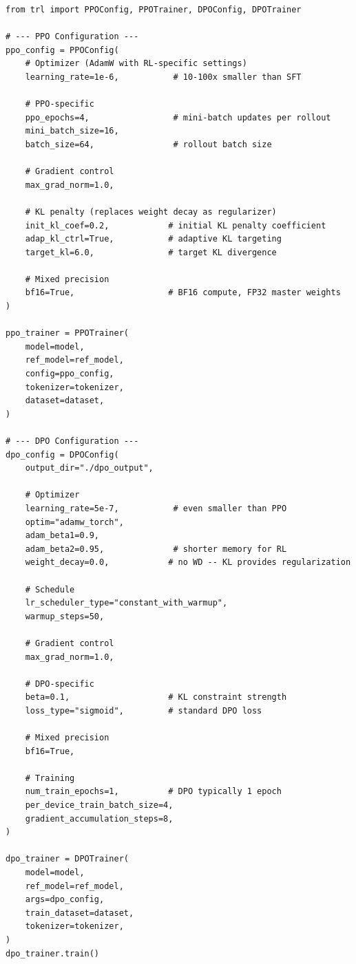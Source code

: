 \begin{lstlisting}[style=pythonstyle, caption={Complete PPO and DPO optimizer configuration using TRL.}]
from trl import PPOConfig, PPOTrainer, DPOConfig, DPOTrainer

# --- PPO Configuration ---
ppo_config = PPOConfig(
    # Optimizer (AdamW with RL-specific settings)
    learning_rate=1e-6,           # 10-100x smaller than SFT
    
    # PPO-specific
    ppo_epochs=4,                 # mini-batch updates per rollout
    mini_batch_size=16,
    batch_size=64,                # rollout batch size
    
    # Gradient control
    max_grad_norm=1.0,
    
    # KL penalty (replaces weight decay as regularizer)
    init_kl_coef=0.2,            # initial KL penalty coefficient
    adap_kl_ctrl=True,           # adaptive KL targeting
    target_kl=6.0,               # target KL divergence
    
    # Mixed precision
    bf16=True,                   # BF16 compute, FP32 master weights
)

ppo_trainer = PPOTrainer(
    model=model,
    ref_model=ref_model,
    config=ppo_config,
    tokenizer=tokenizer,
    dataset=dataset,
)

# --- DPO Configuration ---
dpo_config = DPOConfig(
    output_dir="./dpo_output",
    
    # Optimizer
    learning_rate=5e-7,           # even smaller than PPO
    optim="adamw_torch",
    adam_beta1=0.9,
    adam_beta2=0.95,              # shorter memory for RL
    weight_decay=0.0,            # no WD -- KL provides regularization
    
    # Schedule
    lr_scheduler_type="constant_with_warmup",
    warmup_steps=50,
    
    # Gradient control
    max_grad_norm=1.0,
    
    # DPO-specific
    beta=0.1,                    # KL constraint strength
    loss_type="sigmoid",         # standard DPO loss
    
    # Mixed precision
    bf16=True,
    
    # Training
    num_train_epochs=1,          # DPO typically 1 epoch
    per_device_train_batch_size=4,
    gradient_accumulation_steps=8,
)

dpo_trainer = DPOTrainer(
    model=model,
    ref_model=ref_model,
    args=dpo_config,
    train_dataset=dataset,
    tokenizer=tokenizer,
)
dpo_trainer.train()
\end{lstlisting}

